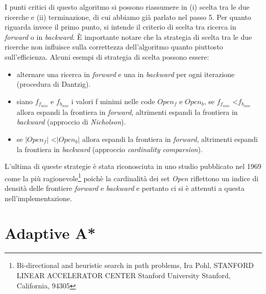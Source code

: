\documentclass[11pt]{book}
\begin{document}
\par{
I punti critici di questo algoritmo si possono riassumere in (i) scelta tra le due ricerche e (ii) terminazione, di cui abbiamo gi\`a parlato nel passo 5.
Per quanto riguarda invece il primo punto, si intende il criterio di scelta tra ricerca in \emph{forward} o in \emph{backward}. \`E importante notare che la strategia di scelta tra le due ricerche non influisce sulla correttezza dell'algoritmo quanto piuttosto sull'efficienza. Alcuni esempi di strategia di scelta possono essere: \begin{itemize}
\item alternare una ricerca in \emph{forward} e una in \emph{backward} per ogni iterazione (procedura di Dantzig).
\item siano $f_{f_{min}}$ e $f_{b_{min}}$ i valori f minimi nelle code $Open_{f}$ e $Open_{b}$, se $f_{f_{min}}$ \textless $f_{b_{min}}$ allora espandi la frontiera in \emph{forward}, altrimenti espandi la frontiera in \emph{backward} (approccio di \emph{Nicholson}).
\item se $|Open_{f}|$ \textless $|Open_{b}|$ allora espandi la frontiera in \emph{forward}, altrimenti espandi la frontiera in \emph{backward} (approccio \emph{cardinality comparsion}).
\end{itemize}
}
\par{L'ultima di queste strategie \`e stata riconosciuta in uno studio pubblicato nel 1969 come la pi\`u ragionevole\footnote{Bi-directional and heuristic search in path problems, Ira Pohl, STANFORD LINEAR ACCELERATOR CENTER Stanford University Stanford, California, 94305} poich\`e la cardinalit\`a dei set \emph{Open} riflettono un indice di densit\`a delle frontiere \emph{forward} e \emph{backward} e pertanto ci si \`e attenuti a questa nell'implementazione.}


\section{Adaptive A*}
\label{sec:adaptive}
\end{document}
